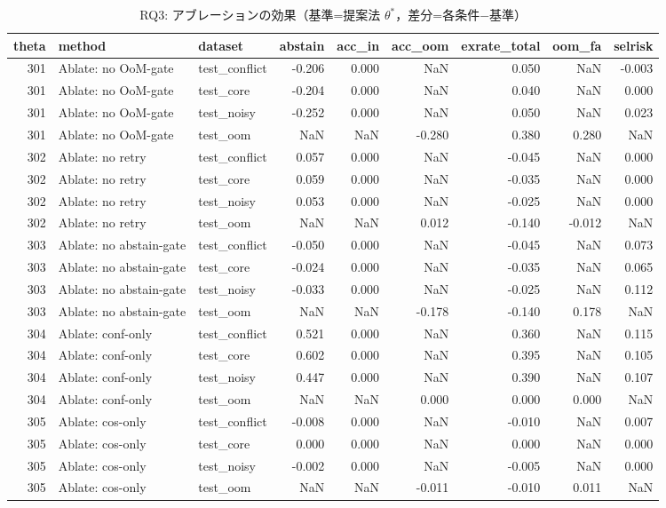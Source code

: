 \begin{table}[t]
\centering
\begin{tabular}{rllrrrrrr}
\toprule
theta & method & dataset & abstain & acc_in & acc_oom & exrate_total & oom_fa & selrisk \\
\midrule
301 & Ablate: no OoM-gate & test_conflict & -0.206 & 0.000 & NaN & 0.050 & NaN & -0.003 \\
301 & Ablate: no OoM-gate & test_core & -0.204 & 0.000 & NaN & 0.040 & NaN & 0.000 \\
301 & Ablate: no OoM-gate & test_noisy & -0.252 & 0.000 & NaN & 0.050 & NaN & 0.023 \\
301 & Ablate: no OoM-gate & test_oom & NaN & NaN & -0.280 & 0.380 & 0.280 & NaN \\
302 & Ablate: no retry & test_conflict & 0.057 & 0.000 & NaN & -0.045 & NaN & 0.000 \\
302 & Ablate: no retry & test_core & 0.059 & 0.000 & NaN & -0.035 & NaN & 0.000 \\
302 & Ablate: no retry & test_noisy & 0.053 & 0.000 & NaN & -0.025 & NaN & 0.000 \\
302 & Ablate: no retry & test_oom & NaN & NaN & 0.012 & -0.140 & -0.012 & NaN \\
303 & Ablate: no abstain-gate & test_conflict & -0.050 & 0.000 & NaN & -0.045 & NaN & 0.073 \\
303 & Ablate: no abstain-gate & test_core & -0.024 & 0.000 & NaN & -0.035 & NaN & 0.065 \\
303 & Ablate: no abstain-gate & test_noisy & -0.033 & 0.000 & NaN & -0.025 & NaN & 0.112 \\
303 & Ablate: no abstain-gate & test_oom & NaN & NaN & -0.178 & -0.140 & 0.178 & NaN \\
304 & Ablate: conf-only & test_conflict & 0.521 & 0.000 & NaN & 0.360 & NaN & 0.115 \\
304 & Ablate: conf-only & test_core & 0.602 & 0.000 & NaN & 0.395 & NaN & 0.105 \\
304 & Ablate: conf-only & test_noisy & 0.447 & 0.000 & NaN & 0.390 & NaN & 0.107 \\
304 & Ablate: conf-only & test_oom & NaN & NaN & 0.000 & 0.000 & 0.000 & NaN \\
305 & Ablate: cos-only & test_conflict & -0.008 & 0.000 & NaN & -0.010 & NaN & 0.007 \\
305 & Ablate: cos-only & test_core & 0.000 & 0.000 & NaN & 0.000 & NaN & 0.000 \\
305 & Ablate: cos-only & test_noisy & -0.002 & 0.000 & NaN & -0.005 & NaN & 0.000 \\
305 & Ablate: cos-only & test_oom & NaN & NaN & -0.011 & -0.010 & 0.011 & NaN \\
\bottomrule
\end{tabular}

\caption{RQ3: アブレーションの効果（基準=提案法 $\theta^*$，差分=各条件−基準）}
\label{tab:rq3_ablation_delta}
\end{table}
